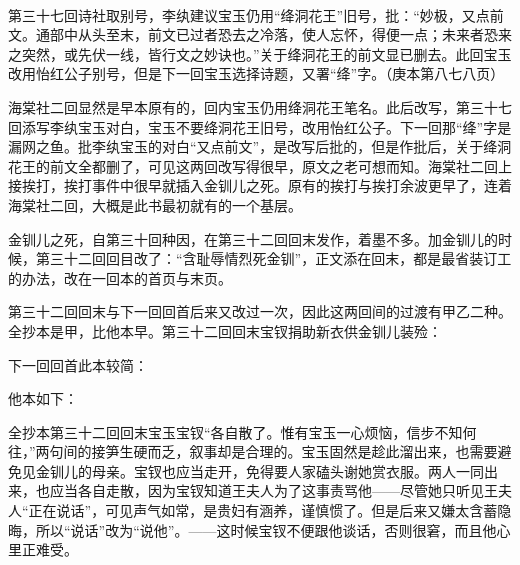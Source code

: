 \par 第三十七回诗社取别号，李纨建议宝玉仍用“绛洞花王”旧号，批：“妙极，又点前文。通部中从头至末，前文已过者恐去之冷落，使人忘怀，得便一点；未来者恐来之突然，或先伏一线，皆行文之妙诀也。”关于绛洞花王的前文显已删去。此回宝玉改用怡红公子别号，但是下一回宝玉选择诗题，又署“绛”字。（庚本第八七八页）
\par 海棠社二回显然是早本原有的，回内宝玉仍用绛洞花王笔名。此后改写，第三十七回添写李纨宝玉对白，宝玉不要绛洞花王旧号，改用怡红公子。下一回那“绛”字是漏网之鱼。批李纨宝玉的对白“又点前文”，是改写后批的，但是作批后，关于绛洞花王的前文全都删了，可见这两回改写得很早，原文之老可想而知。海棠社二回上接挨打，挨打事件中很早就插入金钏儿之死。原有的挨打与挨打余波更早了，连着海棠社二回，大概是此书最初就有的一个基层。
\par 金钏儿之死，自第三十回种因，在第三十二回回末发作，着墨不多。加金钏儿的时候，第三十二回回目改了：“含耻辱情烈死金钏”，正文添在回末，都是最省装订工的办法，改在一回本的首页与末页。
\par 第三十二回回末与下一回回首后来又改过一次，因此这两回间的过渡有甲乙二种。全抄本是甲，比他本早。第三十二回回末宝钗捐助新衣供金钏儿装殓：
\par 下一回回首此本较简：
\par 他本如下：
\par 全抄本第三十二回回末宝玉宝钗“各自散了。惟有宝玉一心烦恼，信步不知何往，”两句间的接笋生硬而乏，叙事却是合理的。宝玉固然是趁此溜出来，也需要避免见金钏儿的母亲。宝钗也应当走开，免得要人家磕头谢她赏衣服。两人一同出来，也应当各自走散，因为宝钗知道王夫人为了这事责骂他——尽管她只听见王夫人“正在说话”，可见声气如常，是贵妇有涵养，谨慎惯了。但是后来又嫌太含蓄隐晦，所以“说话”改为“说他”。——这时候宝钗不便跟他谈话，否则很窘，而且他心里正难受。
